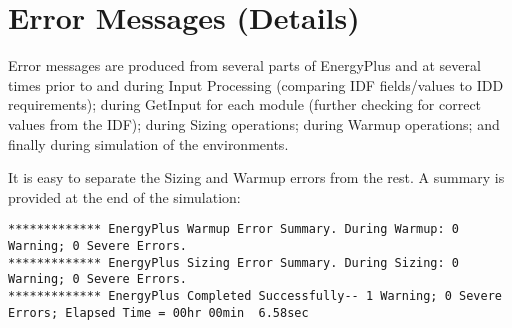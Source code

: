 \chapter{Error Messages (Details)}\label{error-messages-details}

Error messages are produced from several parts of EnergyPlus and at several times prior to and during Input Processing (comparing IDF fields/values to IDD requirements); during GetInput for each module (further checking for correct values from the IDF); during Sizing operations; during Warmup operations; and finally during simulation of the environments.

It is easy to separate the Sizing and Warmup errors from the rest. A summary is provided at the end of the simulation:

\begin{lstlisting}
************* EnergyPlus Warmup Error Summary. During Warmup: 0 Warning; 0 Severe Errors.
************* EnergyPlus Sizing Error Summary. During Sizing: 0 Warning; 0 Severe Errors.
************* EnergyPlus Completed Successfully-- 1 Warning; 0 Severe Errors; Elapsed Time = 00hr 00min  6.58sec
\end{lstlisting}
